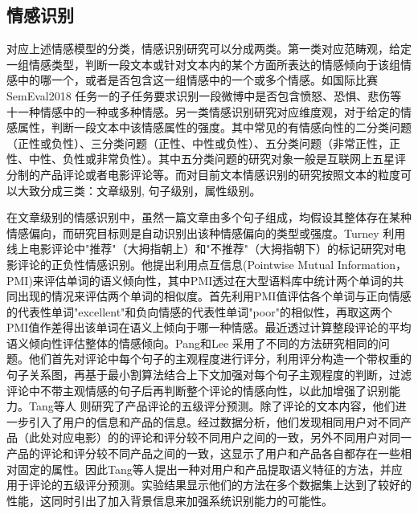 \subsection{情感识别}

对应上述情感模型的分类，情感识别研究可以分成两类。第一类对应范畴观，给定一组情感类型，判断一段文本或针对文本内的某个方面所表达的情感倾向于该组情感中的哪一个，或者是否包含这一组情感中的一个或多个情感。如国际比赛SemEval2018 \cite{mohammad2018semeval}任务一的子任务要求识别一段微博中是否包含愤怒、恐惧、悲伤等十一种情感中的一种或多种情感。另一类情感识别研究对应维度观，对于给定的情感属性，判断一段文本中该情感属性的强度。其中常见的有情感向性的二分类问题（正性或负性）、三分类问题（正性、中性或负性）、五分类问题（非常正性，正性、中性、负性或非常负性）。其中五分类问题的研究对象一般是互联网上五星评分制的产品评论或者电影评论等。而对目前文本情感识别的研究按照文本的粒度可以大致分成三类：文章级别, 句子级别，属性级别。

在文章级别的情感识别中，虽然一篇文章由多个句子组成，均假设其整体存在某种情感偏向，而研究目标则是自动识别出该种情感偏向的类型或强度。Turney \cite{turney2002thumbs} 利用线上电影评论中"推荐"（大拇指朝上）和"不推荐"（大拇指朝下）的标记研究对电影评论的正负性情感识别。他提出利用点互信息(Pointwise Mutual Information，PMI)来评估单词的语义倾向性，其中PMI透过在大型语料库中统计两个单词的共同出现的情况来评估两个单词的相似度。首先利用PMI值评估各个单词与正向情感的代表性单词"excellent"和负向情感的代表性单词"poor"的相似性，再取这两个PMI值作差得出该单词在语义上倾向于哪一种情感。最近透过计算整段评论的平均语义倾向性评估整体的情感倾向。Pang和Lee \cite{pang2004sentimental} 采用了不同的方法研究相同的问题。他们首先对评论中每个句子的主观程度进行评分，利用评分构造一个带权重的句子关系图，再基于最小割算法结合上下文加强对每个句子主观程度的判断，过滤评论中不带主观情感的句子后再判断整个评论的情感向性，以此加增强了识别能力。Tang等人 \cite{tang2015learning} 则研究了产品评论的五级评分预测。除了评论的文本内容，他们进一步引入了用户的信息和产品的信息。经过数据分析，他们发现相同用户对不同产品（此处对应电影）的的评论和评分较不同用户之间的一致，另外不同用户对同一产品的评论和评分较不同产品之间的一致，这显示了用户和产品各自都存在一些相对固定的属性。因此Tang等人提出一种对用户和产品提取语义特征的方法，并应用于评论的五级评分预测。实验结果显示他们的方法在多个数据集上达到了较好的性能，这同时引出了加入背景信息来加强系统识别能力的可能性。

